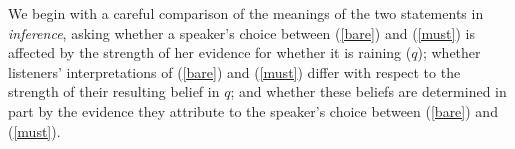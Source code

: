 \documentclass[11pt]{article}
\newcommand{\red}[1]{\textcolor{Red}{#1}}
\begin{document}
We begin with a careful comparison of the meanings of the two statements in \emph{inference},
%
%
%
%
%
%
asking whether a speaker's choice between (\ref{bare}) and (\ref{must}) is affected by the strength of her evidence for whether it is raining ($q$); whether listeners' interpretations of  (\ref{bare}) and (\ref{must})  differ with respect to the strength of their resulting belief in $q$; and whether these beliefs are determined in part by the evidence they attribute to the speaker's choice between (\ref{bare}) and (\ref{must}).
\end{document}
